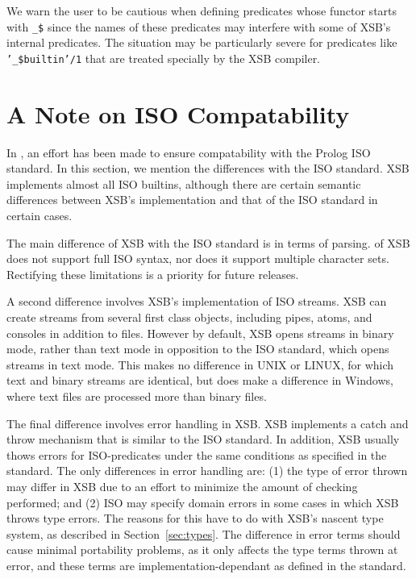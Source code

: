 We warn the user to be cautious when defining predicates whose functor
starts with {\tt \_\$} since the names of these predicates may
interfere with some of XSB's internal predicates.  The situation may
be particularly severe for predicates like {\tt '\_\$builtin'/1} that
are treated specially by the XSB compiler.

\section{A Note on ISO Compatability} \label{sec:iso}

In \version, an effort has been made to ensure compatability with the
Prolog ISO standard.  In this section, we mention the differences with
the ISO standard.  XSB implements almost all ISO builtins, although
there are certain semantic differences between XSB's implementation
and that of the ISO standard in certain cases.

The main difference of XSB with the ISO standard is in terms of
parsing.  \version{} of XSB does not support full ISO syntax, nor does
it support multiple character sets.  Rectifying these limitations is a
priority for future releases.

A second difference involves XSB's implementation of ISO streams.  XSB
can create streams from several first class objects, including pipes,
atoms, and consoles in addition to files.  However by default, XSB
opens streams in binary mode, rather than text mode in opposition to
the ISO standard, which opens streams in text mode.  This makes no
difference in UNIX or LINUX, for which text and binary streams are
identical, but does make a difference in Windows, where text files are
processed more than binary files.


The final difference involves error handling in XSB.  XSB implements a
catch and throw mechanism that is similar to the ISO standard.  In
addition, XSB usually thows errors for ISO-predicates under the same
conditions as specified in the standard.  The only differences in
error handling are: (1) the type of error thrown may differ in XSB due
to an effort to minimize the amount of checking performed; and (2) ISO
may specify domain errors in some cases in which XSB throws type
errors.  The reasons for this have to do with XSB's nascent type
system, as described in Section~\ref{sec:types}.  The difference in
error terms should cause minimal portability problems, as it only
affects the type terms thrown at error, and these terms are
implementation-dependant as defined in the standard.




